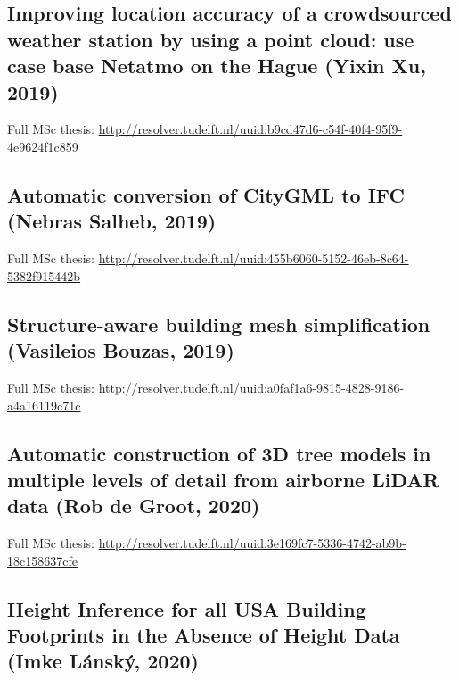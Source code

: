 \subsection{Improving location accuracy of a crowdsourced weather station by using a point cloud: use case base Netatmo on the Hague (Yixin Xu, 2019)}

\begin{kaobox}[frametitle=\faExternalLink\ To read or to watch.]
Full MSc thesis: \url{http://resolver.tudelft.nl/uuid:b9cd47d6-c54f-40f4-95f9-4e9624f1c859}
\end{kaobox}

\subsection{Automatic conversion of CityGML to IFC (Nebras Salheb, 2019)}

\begin{kaobox}[frametitle=\faExternalLink\ To read or to watch.]
Full MSc thesis: \url{http://resolver.tudelft.nl/uuid:455b6060-5152-46eb-8c64-5382f915442b}
\end{kaobox}

\subsection{Structure-aware building mesh simplification (Vasileios Bouzas, 2019)}

\begin{kaobox}[frametitle=\faExternalLink\ To read or to watch.]
Full MSc thesis: \url{http://resolver.tudelft.nl/uuid:a0faf1a6-9815-4828-9186-a4a16119c71c}
\end{kaobox}

\subsection{Automatic construction of 3D tree models in multiple levels of detail from airborne LiDAR data (Rob de Groot, 2020)}

\begin{kaobox}[frametitle=\faExternalLink\ To read or to watch.]
Full MSc thesis: \url{http://resolver.tudelft.nl/uuid:3e169fc7-5336-4742-ab9b-18c158637cfe}
\end{kaobox}

\subsection{Height Inference for all USA Building Footprints in the Absence of Height Data (Imke Lánský, 2020)}

